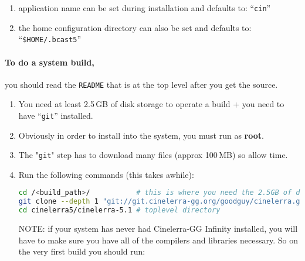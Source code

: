 \begin{enumerate}
    \item 
        application name can be set during installation and defaults to: “\texttt{cin}”
    \item 
        the home configuration directory can also be set and defaults to:\\ “\texttt{\$HOME/.bcast5}”
\end{enumerate}

\paragraph{To do a system build,} you should read the \texttt{README} that is at the top level after you get the source.

\begin{enumerate}
    \item 
        You need at least 2.5\,GB of disk storage to operate a build + you need to have “\texttt{git}” installed.
    \item  Obviously in order to install into the system, you must run as \textbf{root}.
    \item  The "\texttt{git}" step has to download many files (approx 100\,MB) so allow time.
    \item  Run the following commands (this takes awhile):

        \begin{lstlisting}[language=bash]
cd /<build_path>/           # this is where you need the 2.5GB of disk space
git clone --depth 1 "git://git.cinelerra-gg.org/goodguy/cinelerra.git" cinelerra5 
cd cinelerra5/cinelerra-5.1 # toplevel directory
        \end{lstlisting}

        NOTE: if your system has never had Cinelerra-GG Infinity installed, you will have to make sure you have all of the compilers and libraries necessary.  
        So on the very first build you should run:


\end{enumerate}
